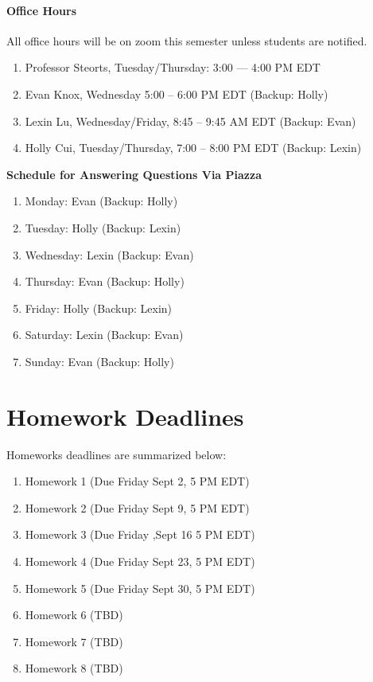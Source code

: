 \documentclass[11pt]{article}
\begin{document}
\paragraph{Office Hours}
All office hours will be on zoom this semester unless students are notified.
\begin{enumerate}
\item Professor Steorts, Tuesday/Thursday: 3:00 --- 4:00 PM EDT \\
\item Evan Knox, Wednesday 5:00 -- 6:00 PM EDT  (Backup: Holly)\\
\item Lexin Lu, Wednesday/Friday, 8:45 -- 9:45 AM EDT  (Backup: Evan)\\
\item Holly Cui, Tuesday/Thursday, 7:00 -- 8:00 PM EDT (Backup: Lexin)\\
\end{enumerate}


\textbf{Schedule for Answering Questions Via Piazza}
\begin{enumerate}
\item Monday: Evan (Backup: Holly)
\item Tuesday: Holly (Backup: Lexin)
\item Wednesday: Lexin (Backup: Evan)
\item Thursday: Evan (Backup: Holly)
\item Friday: Holly (Backup: Lexin)
\item Saturday: Lexin (Backup: Evan)
\item Sunday: Evan (Backup: Holly)
\end{enumerate}



\section{Homework Deadlines}
Homeworks deadlines are summarized below:

\begin{enumerate}
\item Homework 1 (Due Friday Sept 2, 5 PM EDT)
\item Homework 2 (Due Friday Sept 9, 5 PM EDT)
\item Homework 3 (Due Friday ,Sept 16 5 PM EDT)
\item Homework 4 (Due Friday Sept 23, 5 PM EDT)
\item Homework 5 (Due Friday Sept 30, 5 PM EDT)
\item Homework 6 (TBD)
\item Homework 7 (TBD)
\item Homework 8 (TBD)
\end{enumerate} 
\end{document}
